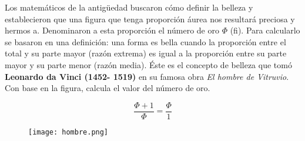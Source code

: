 \begin{boxF}
    Los matemáticos de la antigüedad buscaron cómo definir la belleza y
    establecieron que una figura que tenga proporción áurea nos resultará
    preciosa y hermos a. Denominaron a esta proporción el número de oro
    $\Phi$ (fi). Para calcularlo se basaron en una definición: una forma es bella
    cuando la proporción entre el total y su parte mayor (razón extrema) es
    igual a la proporción entre su parte mayor y su parte menor (razón media).
    Éste es el concepto de belleza que tomó \textbf{Leonardo da Vinci (1452-
        1519)} en su famosa obra \emph{El hombre de Vitruvio}. Con base en la figura,
    calcula el valor del número de oro.

    \[ \frac{\Phi+1}{\Phi} = \frac{\Phi}{1} \]

    \begin{figure}[H]
        \centering
        \texttt{[image: hombre.png]}
        \label{fig:hombre}
    \end{figure}

\end{boxF}

\newpage